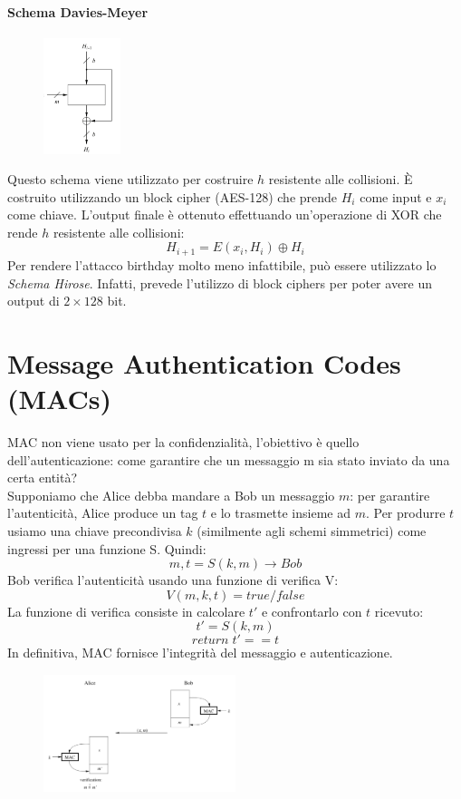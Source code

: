 \documentclass[a4paper,12pt]{article}
\begin{document}
\paragraph{Schema Davies-Meyer}
\begin{figure}[H]
  \centering
  \includegraphics[width=0.2\textwidth]{img/davies-meyer}
\end{figure}
Questo schema viene utilizzato per costruire $h$ resistente alle collisioni. È costruito utilizzando un block cipher (AES-128) che prende $H_i$ come input e $x_i$ come chiave.
L'output finale è ottenuto effettuando un'operazione di XOR che rende $h$ resistente alle collisioni:
$$ H_{i+1} = E(x_i, H_i) \oplus H_i $$ 
Per rendere l'attacco birthday molto meno infattibile, può essere utilizzato lo \textit{Schema Hirose}. Infatti, prevede l'utilizzo di block ciphers per poter avere un output di $2\times128$ bit.

\newpage

\section{Message Authentication Codes (MACs)}
MAC non viene usato per la confidenzialità, l'obiettivo è quello dell'autenticazione: come garantire che un messaggio m sia stato inviato da una certa entità? \\
Supponiamo che Alice debba mandare a Bob un messaggio $m$: per garantire l'autenticità, Alice produce un tag $t$ e lo trasmette insieme ad $m$. 
Per produrre $t$ usiamo una chiave precondivisa $k$ (similmente agli schemi simmetrici) come ingressi per una funzione S. Quindi:
$$ m,t = S(k,m) \rightarrow Bob$$
Bob verifica l'autenticità usando una funzione di verifica V:
$$V(m,k,t) = true/false$$
La funzione di verifica consiste in calcolare $t'$ e confrontarlo con $t$ ricevuto:
$$t' = S(k,m)$$
$$return\;t' == t$$
In definitiva, MAC fornisce l'integrità del messaggio e autenticazione.

\begin{figure}[H]
  \centering
  \includegraphics[width=0.5\textwidth]{img/mac}
\end{figure}
\end{document}
